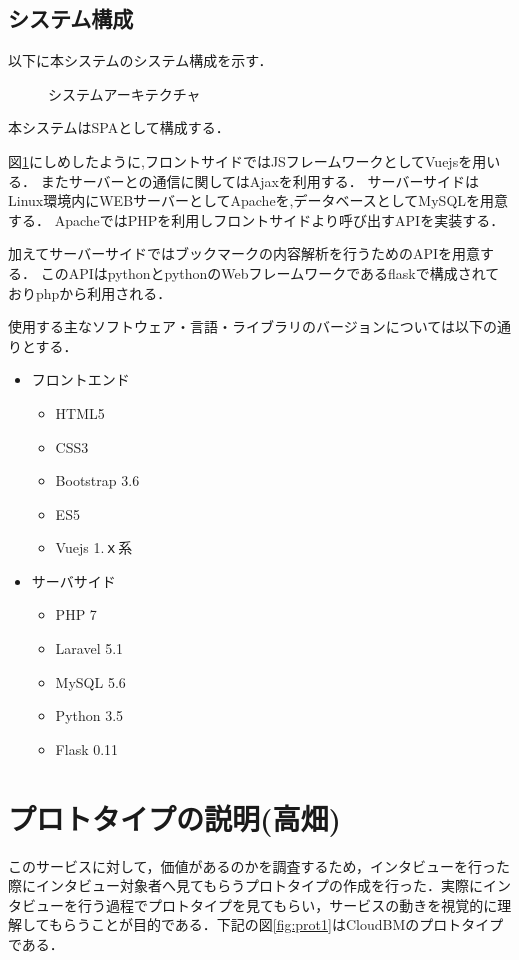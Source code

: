\documentclass[a4paper,10pt,fleqn]{jsarticle}
\begin{document}
\subsection{システム構成}
以下に本システムのシステム構成を示す．
\begin{figure}[htbp]
  \begin{center}
    \caption{システムアーキテクチャ}
    \label{fig:system}
  \end{center}
\end{figure}
本システムはSPAとして構成する．\par
図\ref{fig:system}にしめしたように,フロントサイドではJSフレームワークとしてVuejsを用いる． またサーバーとの通信に関してはAjaxを利用する．
サーバーサイドはLinux環境内にWEBサーバーとしてApacheを,データベースとしてMySQLを用意する． ApacheではPHPを利用しフロントサイドより呼び出すAPIを実装する．\par
加えてサーバーサイドではブックマークの内容解析を行うためのAPIを用意する． このAPIはpythonとpythonのWebフレームワークであるflaskで構成されておりphpから利用される．\\
\par
使用する主なソフトウェア・言語・ライブラリのバージョンについては以下の通りとする．
\begin{itemize}
 \item フロントエンド
    \begin{itemize}
    \item HTML5
    \item CSS3
      \item Bootstrap 3.6
      \item ES5
      \item Vuejs 1.ｘ系
     \end{itemize}
 \item サーバサイド
     \begin{itemize}
    \item PHP 7
    \item Laravel  5.1
      \item MySQL 5.6
      \item Python 3.5
      \item Flask 0.11
     \end{itemize}
\end{itemize}
\section{プロトタイプの説明(高畑)}
このサービスに対して，価値があるのかを調査するため，インタビューを行った際にインタビュー対象者へ見てもらうプロトタイプの作成を行った．実際にインタビューを行う過程でプロトタイプを見てもらい，サービスの動きを視覚的に理解してもらうことが目的である．下記の図\ref{fig:prot1}はCloudBMのプロトタイプである．
\end{document}

